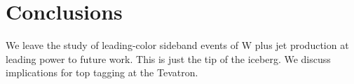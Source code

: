 \section{Conclusions}\label{sec:conclusions}

We leave the study of leading-color sideband events of W plus jet
production at leading power to future work. This is just the tip of the
iceberg. We discuss implications for top tagging at the Tevatron.


